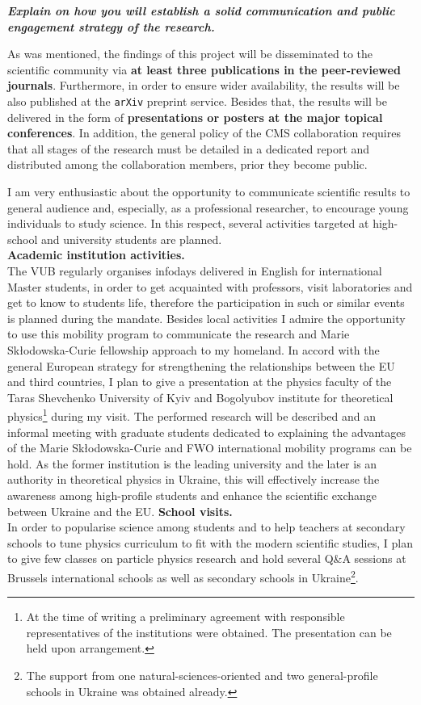 \begin{center}
\textbf{\textit{{\Large Explain on how you will establish a solid communication and public engagement strategy of the research.}}}\\
\end{center}
As was mentioned, the findings of this project will be disseminated to the scientific community via \textbf{at least three publications in the peer-reviewed journals}. Furthermore, in order to ensure wider availability, the results will be also published at the \texttt{arXiv} preprint service. Besides that, the results will be delivered in the form of \textbf{presentations or posters at the major topical conferences}. In addition, the general policy of the CMS collaboration requires that all stages of the research must be detailed in a dedicated report and distributed among the collaboration members, prior they become public.

I am very enthusiastic about the opportunity to communicate scientific results to general audience and, especially, as a professional researcher, to encourage young individuals to study science. In this respect, several activities targeted at high-school and university students are planned.\\
\textbf{Academic institution activities.}\\
The VUB regularly organises infodays delivered in English for international Master students, in order to get acquainted with professors, visit laboratories and get to know to students life, therefore the participation in such or similar events is planned during the mandate. Besides local activities I admire the opportunity to use this mobility program to communicate the research and Marie Sk\l{}odowska-Curie fellowship approach to my homeland. In accord with the general European strategy for strengthening the relationships between the EU and third countries, I plan to give a presentation at the physics faculty of the Taras Shevchenko University of Kyiv and Bogolyubov institute for theoretical physics\footnote{At the time of writing a preliminary agreement with responsible representatives of the institutions were obtained. The presentation can be held upon arrangement.} during my visit. The performed research will be described and an informal meeting with graduate students dedicated to explaining the advantages of the Marie Sk\l{}odowska-Curie and FWO international mobility programs can be hold. As the former institution is the leading university and the later is an authority in theoretical physics in Ukraine, this will effectively increase the awareness among high-profile students and enhance the scientific exchange between Ukraine and the EU.
\newline
\textbf{School visits.}\\
In order to popularise science among students and to help teachers at secondary schools to tune physics curriculum to fit with the modern scientific studies, I plan to give few classes on particle physics research and hold several Q\&A sessions at Brussels international schools as well as secondary schools in Ukraine\footnote{The support from one natural-sciences-oriented and two general-profile schools in Ukraine was obtained already.}. 